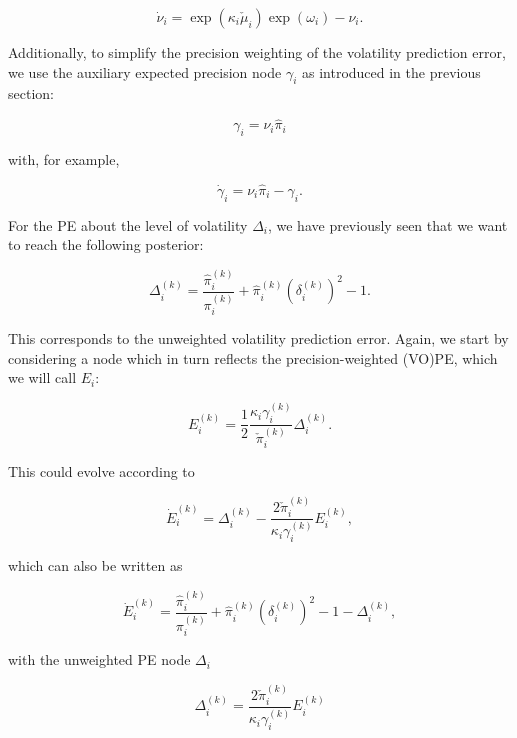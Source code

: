 \begin{equation}
	\dot{\nu}_i = \exp(\kappa_i \check{\mu}_i) \exp(\omega_i) - \nu_i.
\end{equation}

Additionally, to simplify the precision weighting of the volatility prediction error, we use the auxiliary expected precision node $\gamma_i$ as introduced in the previous section:

\begin{equation}
  \gamma_i = \nu_i \hat{\pi}_i
\end{equation}

with, for example, 

\begin{equation}
  \dot{\gamma}_i = \nu_i \hat{\pi}_i - \gamma_i.
\end{equation}

For the \textsf{PE} about the level of volatility $\Delta_i$, we have previously seen that we want to reach the following posterior:

\begin{equation}
	\Delta_i^{(k)} = \frac{\hat{\pi}_i^{(k)}}{\pi_{i}^{(k)}} + \hat{\pi}_i^{(k)} (\delta_i^{(k)})^2 - 1.
\end{equation}

This corresponds to the unweighted volatility prediction error. Again, we start by considering a node which in turn reflects the precision-weighted (VO)PE, which we will call $E_i$:

\begin{equation}
	E_i^{(k)} = \frac{1}{2} \frac{\kappa_i \gamma_i^{(k)}}{\check{\pi}_i^{(k)}} \Delta_i^{(k)}.
\end{equation}

This could evolve according to 

\begin{equation}
	\dot{E}_i^{(k)} = \Delta_i^{(k)} - \frac{2 \check{\pi}_i^{(k)}}{\kappa_i \gamma_i^{(k)}} E_i^{(k)},
\end{equation}

which can also be written as 

\begin{equation}
	\dot{E}_i^{(k)} = \frac{\hat{\pi}_i^{(k)}}{\pi_{i}^{(k)}} + \hat{\pi}_i^{(k)} (\delta_i^{(k)})^2 - 1 - \Delta_i^{(k)},
\end{equation}

with the unweighted PE node $\Delta_i$

\begin{equation}
	\Delta_i^{(k)} = \frac{2 \check{\pi}_i^{(k)}}{\kappa_i \gamma_i^{(k)}} E_i^{(k)}
\end{equation}

